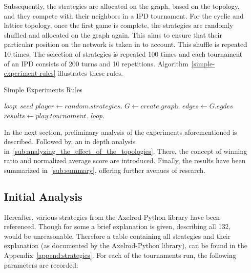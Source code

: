 Subsequently, the strategies are allocated on the graph, based
on the topology, and they compete with their neighbors in a IPD tournament.
For the cyclic and lattice topology, once the first game is complete,
the strategies are randomly shuffled and allocated on the graph again. This aims
to ensure that their particular position on the network is taken in to account.
This shuffle is repeated 10 times. The selection of strategies is repeated 100 times
and each tournament of an IPD consists of 200 turns and 10 repetitions.
Algorithm~\ref{simple-experiment-rules} illustrates these rules.

\begin{algorithm}
	\caption{Simple Experiments Rules}\label{simple-experiment-rules}
	\begin{algorithmic}
		\BState \emph{loop}:
		\State $seed$ 
		\State $player \gets \textit{random.strategies}$.
		\State $G \gets \textit{create.graph}$.
		\State $edges \gets \textit{G.egdes}$
		\State $results \gets \textit{play.tournament}$.
		\emph{loop}.
		\EndFor
		\EndFor
		\EndProcedure
	\end{algorithmic}
\end{algorithm}

In the next section, preliminary analysis of the experiments aforementioned
is described. Followed by, an in depth analysis in~\autoref{sub:analyzing_the_effect_of_the_topologies}.
There, the concept of winning ratio and normalized average score are introduced.
Finally, the results have been summarized in~\autoref{sub:summary}, offering further
avenues of research.

\subsection{Initial Analysis}
\label{sub:initial_analysis}
Hereafter, various strategies from the Axelrod-Python library have been referenced.
Though for some a brief explanation is given, describing all 132, would be
unreasonable. Therefore a table containing all strategies and their explanation
(as documented by the Axelrod-Python library), can be found in the Appendix~\ref{append:strategies}.
For each of the tournaments run, the following parameters are recorded:

